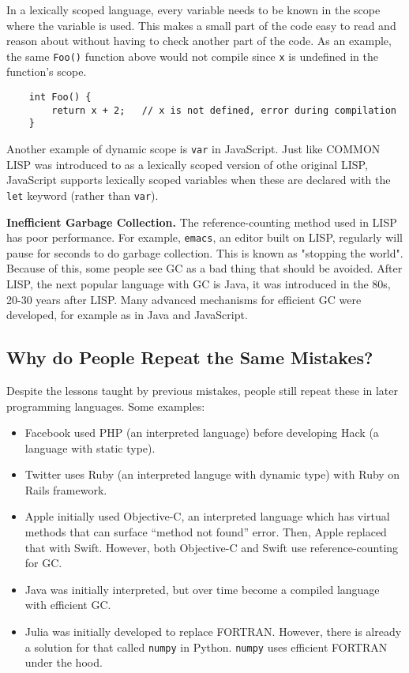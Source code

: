 \documentclass[twoside]{article}
\begin{document}
In a lexically scoped language, every variable needs to be known in the scope where the variable is used. This makes a small part of the code easy to read and reason about without having to check another part of the code. As an example, the same \verb|Foo()| function above would not compile since \verb|x| is undefined in the function's scope.
\begin{verbatim}
    int Foo() {
        return x + 2;   // x is not defined, error during compilation
    }
\end{verbatim}

Another example of dynamic scope is \verb|var| in JavaScript. Just like COMMON LISP was introduced to as a lexically scoped version of othe original LISP, JavaScript supports lexically scoped variables when these are declared with the \verb|let| keyword (rather than \verb|var|).

\textbf{Inefficient Garbage Collection. } The reference-counting method used in LISP has poor performance. For example, \verb|emacs|, an editor built on LISP, regularly will pause for seconds to do garbage collection. This is known as "stopping the world". Because of this, some people see GC as a bad thing that should be avoided. After LISP, the next popular language with GC is Java, it was introduced in the 80s, 20-30 years after LISP. Many advanced mechanisms for efficient GC were developed, for example as in Java and JavaScript.

\subsection{Why do People Repeat the Same Mistakes?}

Despite the lessons taught by previous mistakes, people still repeat these in later programming languages. Some examples:
\begin{itemize}
    \item Facebook used PHP (an interpreted language) before developing Hack (a language with static type).
    \item Twitter uses Ruby (an interpreted languge with dynamic type) with Ruby on Rails framework.
    \item Apple initially used Objective-C, an interpreted language which has virtual methods that can surface “method not found” error. Then, Apple replaced that with Swift. However, both Objective-C and Swift use reference-counting for GC.
    \item Java was initially interpreted, but over time become a compiled language with efficient GC.
    \item Julia was initially developed to replace FORTRAN. However, there is already a solution for that called \verb|numpy| in Python. \verb|numpy| uses efficient FORTRAN under the hood.
\end{itemize}
\end{document}
